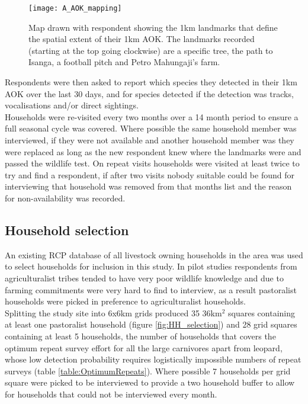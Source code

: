 \begin{figure}[htb]
\centering
\texttt{[image: A\_AOK\_mapping]}
\caption{Map drawn with respondent showing the 1km landmarks that define the spatial extent of their 1km AOK. The landmarks recorded (starting at the top going clockwise) are a specific tree, the path to Isanga, a football pitch and Petro Mahungaji's farm.}
\label{fig:AOK_map}
\end{figure}

Respondents were then asked to report which species they detected in their 1km AOK over the last 30 days, and for species detected if the detection was tracks, vocalisations and/or direct sightings.\\

Households were re-visited every two months over a 14 month period to ensure a full seasonal cycle was covered. Where possible the same household member was interviewed, if they were not available and another household member was they were replaced as long as the new respondent knew where the landmarks were and passed the wildlife test. On repeat visits households were visited at least twice to try and find a respondent, if after two visits nobody suitable could be found for interviewing that household was removed from that months list and the reason for non-availability was recorded.\\

\subsection{Household selection}

An existing RCP database of all livestock owning households in the area was used to select households for inclusion in this study. In pilot studies respondents from agriculturalist tribes tended to have very poor wildlife knowledge and due to farming commitments were very hard to find to interview, as a result pastoralist households were picked in preference to agriculturalist households.\\

Splitting the study site into 6x6km grids produced 35 36km$^2$ squares containing at least one pastoralist household (figure \ref{fig:HH_selection}) and 28 grid squares containing at least 5 households, the number of households that covers the optimum repeat survey effort for all the large carnivores apart from leopard, whose low detection probability requires logistically impossible numbers of repeat surveys (table \ref{table:OptimumRepeats}). Where possible 7 households per grid square were picked to be interviewed to provide a two household buffer to allow for households that could not be interviewed every month.\\

